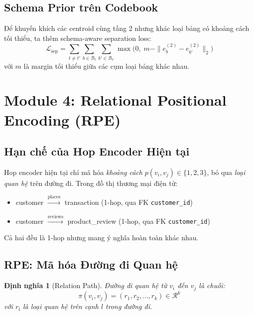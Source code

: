 \documentclass[12pt,a4paper]{article}
\newtheorem{definition}{Định nghĩa}[section]
\begin{document}
\subsection{Schema Prior trên Codebook}

Để khuyến khích các centroid cùng tầng 2 nhưng khác loại bảng có khoảng cách
tối thiểu, ta thêm schema-aware separation loss:
\begin{equation}
  \mathcal{L}_\text{sep} = \sum_{t \ne t'} \sum_{b \in \mathcal{B}_t} \sum_{b' \in \mathcal{B}_{t'}}
    \max\bigl(0,\; m - \|e^{(2)}_b - e^{(2)}_{b'}\|_2\bigr)
  \label{eq:sep_loss}
\end{equation}
với $m$ là margin tối thiểu giữa các cụm loại bảng khác nhau.

\section{Module 4: Relational Positional Encoding (RPE)}

\subsection{Hạn chế của Hop Encoder Hiện tại}

Hop encoder hiện tại chỉ mã hóa \emph{khoảng cách} $p(v_i, v_j) \in \{1,2,3\}$,
bỏ qua \emph{loại quan hệ} trên đường đi. Trong đồ thị thương mại điện tử:
\begin{itemize}[nosep]
  \item customer $\xrightarrow{\text{places}}$ transaction (1-hop, qua FK \texttt{customer\_id})
  \item customer $\xrightarrow{\text{reviews}}$ product\_review (1-hop, qua FK \texttt{customer\_id})
\end{itemize}
Cả hai đều là 1-hop nhưng mang ý nghĩa hoàn toàn khác nhau.

\subsection{RPE: Mã hóa Đường đi Quan hệ}

\begin{definition}[Relation Path]
Đường đi quan hệ từ $v_i$ đến $v_j$ là chuỗi:
\[
  \pi(v_i, v_j) = (r_1, r_2, \ldots, r_k) \in \mathcal{R}^k
\]
với $r_l$ là loại quan hệ trên cạnh $l$ trong đường đi.
\end{definition}
\end{document}
